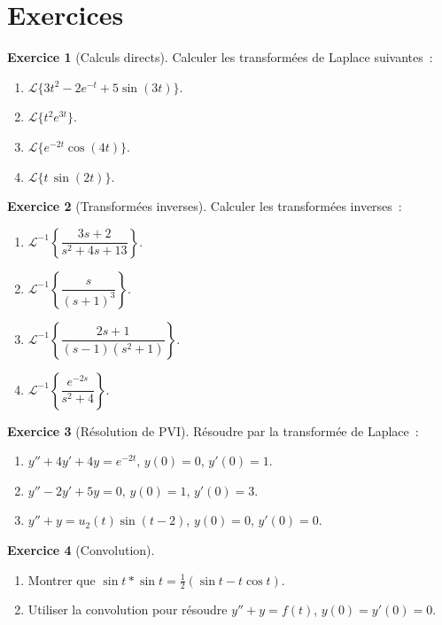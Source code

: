 \documentclass[12pt,a4paper,openany]{book}
\theoremstyle{definition}
\newtheorem{exercice}{Exercice}[chapter]
\theoremstyle{plain}
\theoremstyle{remark}
\begin{document}
\section{Exercices}\label{sec:exo-laplace}

\begin{exercice}[Calculs directs]\label{exo:laplace-direct}
  Calculer les transformées de Laplace suivantes~:
  \begin{enumerate}[label=\alph*)]
    \item $\mathcal{L}\{3t^2-2e^{-t}+5\sin(3t)\}$.
    \item $\mathcal{L}\{t^2 e^{3t}\}$.
    \item $\mathcal{L}\{e^{-2t}\cos(4t)\}$.
    \item $\mathcal{L}\{t\,\sin(2t)\}$.
  \end{enumerate}
\end{exercice}

\begin{exercice}[Transformées inverses]\label{exo:laplace-inv}
  Calculer les transformées inverses~:
  \begin{enumerate}[label=\alph*)]
    \item $\mathcal{L}^{-1}\!\left\{\dfrac{3s+2}{s^2+4s+13}\right\}$.
    \item $\mathcal{L}^{-1}\!\left\{\dfrac{s}{(s+1)^3}\right\}$.
    \item $\mathcal{L}^{-1}\!\left\{\dfrac{2s+1}{(s-1)(s^2+1)}\right\}$.
    \item $\mathcal{L}^{-1}\!\left\{\dfrac{e^{-2s}}{s^2+4}\right\}$.
  \end{enumerate}
\end{exercice}

\begin{exercice}[Résolution de PVI]\label{exo:laplace-pvi}
  Résoudre par la transformée de Laplace~:
  \begin{enumerate}[label=\alph*)]
    \item $y''+4y'+4y=e^{-2t}$, $y(0)=0$, $y'(0)=1$.
    \item $y''-2y'+5y=0$, $y(0)=1$, $y'(0)=3$.
    \item $y''+y=u_2(t)\sin(t-2)$, $y(0)=0$, $y'(0)=0$.
  \end{enumerate}
\end{exercice}

\begin{exercice}[Convolution]\label{exo:convolution}
  \begin{enumerate}[label=\alph*)]
    \item Montrer que $\sin t * \sin t = \frac{1}{2}(\sin t - t\cos t)$.
    \item Utiliser la convolution pour résoudre
      $y''+y=f(t)$, $y(0)=y'(0)=0$.
  \end{enumerate}
\end{exercice}
\end{document}

